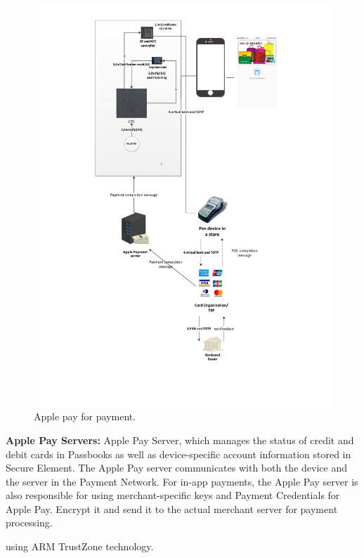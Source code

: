 \documentclass[journal]{IEEEtran}
\begin{document}
\begin{figure}[htbp]
\centerline{\includegraphics[scale=0.7]{iphone_pay.pdf}}
\caption{Apple pay for payment.}
\label{fig}
\end{figure}
    
    \textbf{Apple Pay Servers:} Apple Pay Server, which manages the status of credit and debit cards in Passbooks as well as device-specific account information stored in Secure Element. The Apple Pay server communicates with both the device and the server in the Payment Network. For in-app payments, the Apple Pay server is also responsible for using merchant-specific keys and Payment Credentials for Apple Pay. Encrypt it and send it to the actual merchant server for payment processing.

 using ARM TrustZone technology.
\end{document}
